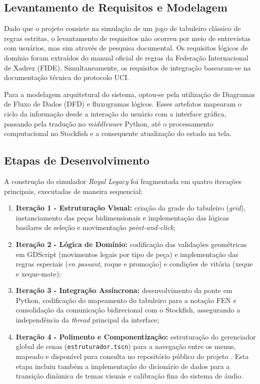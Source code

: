 \subsection{Levantamento de Requisitos e Modelagem}

Dado que o projeto consiste na simulação de um jogo de tabuleiro clássico de regras estritas, o levantamento de requisitos não ocorreu por meio de entrevistas com usuários, mas sim através de pesquisa documental. Os requisitos lógicos de domínio foram extraídos do manual oficial de regras da Federação Internacional de Xadrez (FIDE). Simultaneamente, os requisitos de integração basearam-se na documentação técnica do protocolo UCI.

Para a modelagem arquitetural do sistema, optou-se pela utilização de Diagramas de Fluxo de Dados (DFD) e fluxogramas lógicos. Esses artefatos mapearam o ciclo da informação desde a interação do usuário com a interface gráfica, passando pela tradução no \textit{middleware} Python, até o processamento computacional no Stockfish e a consequente atualização do estado na tela.

\subsection{Etapas de Desenvolvimento}

A construção do simulador \textit{Royal Legacy} foi fragmentada em quatro iterações principais, executadas de maneira sequencial:

\begin{enumerate}
	\item \textbf{Iteração 1 - Estruturação Visual:} criação da grade do tabuleiro (\textit{grid}), instanciamento das peças bidimensionais e implementação das lógicas basilares de seleção e movimentação \textit{point-and-click};
	\item \textbf{Iteração 2 - Lógica de Domínio:} codificação das validações geométricas em GDScript (movimentos legais por tipo de peça) e implementação das regras especiais (\textit{en passant}, roque e promoção) e condições de vitória (xeque e xeque-mate);
	\item \textbf{Iteração 3 - Integração Assíncrona:} desenvolvimento da ponte em Python, codificação do mapeamento do tabuleiro para a notação FEN e consolidação da comunicação bidirecional com o Stockfish, assegurando a independência da \textit{thread} principal da interface;
	\item \textbf{Iteração 4 - Polimento e Componentização:} estruturação do gerenciador global de cenas (\texttt{estruturador.tscn}) para a navegação entre os menus, mapeado e disponível para consulta no repositório público do projeto \cite{RoyalLegacy2026}. Esta etapa incluiu também a implementação do dicionário de dados para a transição dinâmica de temas visuais e calibração fina do sistema de áudio.
\end{enumerate}